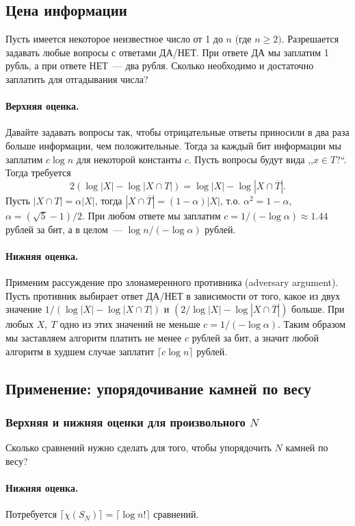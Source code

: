 \documentclass[12pt]{article}
\theoremstyle{definition}
\theoremstyle{plain}
\theoremstyle{remark}
\begin{document}
\subsection{Цена информации}
Пусть имеется некоторое неизвестное число от 1 до \(n\) (где \(n\ge2)\).
Разрешается задавать любые вопросы с ответами ДА/НЕТ. При ответе ДА мы
заплатим 1 рубль, а при ответе НЕТ~— два рубля. Сколько необходимо и достаточно заплатить для отгадывания числа?

\paragraph{Верхняя оценка.} Давайте задавать вопросы так, чтобы отрицательные ответы приносили в два раза больше информации, чем положительные. Тогда за каждый бит информации мы заплатим \(c\log n\) для некоторой константы \(c\). Пусть вопросы будут вида ,,\(x\in T\)?``. Тогда требуется
\[2(\log |X| - \log|X \cap T|) = \log |X| - \log|X\cap\overline T|.\]
Пусть \(|X \cap T| = \alpha|X|\), тогда \(|X\cap\overline T| = (1 - \alpha)|X|\),
т.о. \(\alpha^2 = 1 - \alpha\), \(\alpha=(\sqrt 5 - 1) / 2\). При любом ответе мы заплатим \(c = 1/(-\log \alpha)\approx 1.44\) рублей за бит, а в целом~— \(\log n / (-\log\alpha)\) рублей.

\paragraph{Нижняя оценка.} Применим рассуждение про злонамеренного противника (adversary argument). Пусть противник
выбирает ответ ДА/НЕТ в зависимости от того, какое из двух значение \(1/(\log |X| - \log|X \cap T|)\) и \((2/\log |X| -
\log|X \cap \overline T|)\) больше. При любых \(X,\ T\) одно из этих значений не меньше \(c = 1/(-\log\alpha)\). Таким
образом мы заставляем алгоритм платить не менее \(c\) рублей за бит, а значит любой алгоритм в худшем случае заплатит
\(\lceil c\log n\rceil\) рублей.

\subsection{Применение: упорядочивание камней по весу}
\subsubsection{Верхняя и нижняя оценки для произвольного $N$}
Сколько сравнений нужно сделать для того, чтобы упорядочить \(N\) камней по весу?

\paragraph{Нижняя оценка.} Потребуется \(\lceil\chi(S_N)\rceil = \lceil\log n!\rceil\) сравнений.  
\end{document}
